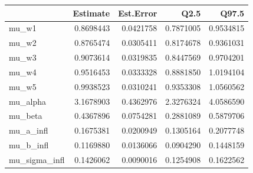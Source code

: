 
\begin{tabular}{lrrrr}
\toprule
  & Estimate & Est.Error & Q2.5 & Q97.5\\
\midrule
mu\_w1 & 0.8698443 & 0.0421758 & 0.7871005 & 0.9534815\\
mu\_w2 & 0.8765474 & 0.0305411 & 0.8174678 & 0.9361031\\
mu\_w3 & 0.9073614 & 0.0319835 & 0.8447569 & 0.9704201\\
mu\_w4 & 0.9516453 & 0.0333328 & 0.8881850 & 1.0194104\\
mu\_w5 & 0.9938523 & 0.0310241 & 0.9353308 & 1.0560562\\
\addlinespace
mu\_alpha & 3.1678903 & 0.4362976 & 2.3276324 & 4.0586590\\
mu\_beta & 0.4367896 & 0.0754281 & 0.2881089 & 0.5879706\\
mu\_a\_infl & 0.1675381 & 0.0200949 & 0.1305164 & 0.2077748\\
mu\_b\_infl & 0.1169880 & 0.0136066 & 0.0904290 & 0.1448159\\
mu\_sigma\_infl & 0.1426062 & 0.0090016 & 0.1254908 & 0.1622562\\
\bottomrule
\end{tabular}
